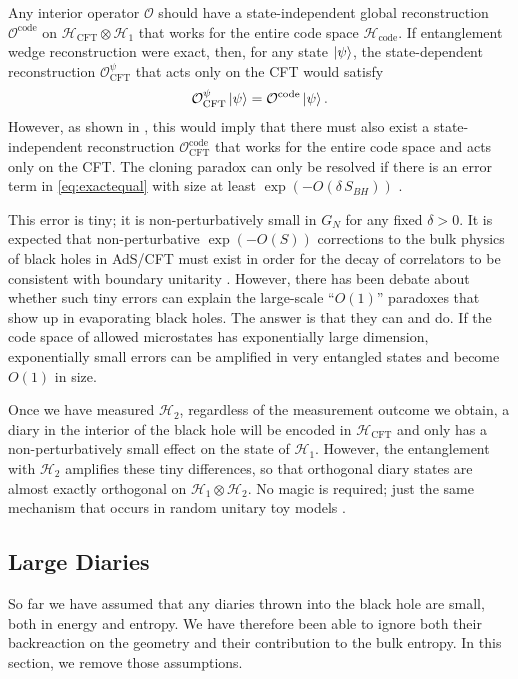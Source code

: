 \documentclass[11pt,a4paper]{article}
\begin{document}
Any interior operator $\mathcal{O}$ should have a state-independent global reconstruction $\mathcal{O}^\text{code}$ on $\mathcal{H}_\text{CFT} \otimes \mathcal{H}_{1}$ that works for the entire code space $\mathcal{H}_\text{code}$. If entanglement wedge reconstruction were exact, then, for any state $\ket{\psi}$, the state-dependent reconstruction $\mathcal{O}_\text{CFT}^{\psi}$ that acts only on the CFT would satisfy
\begin{align} \label{eq:exactequal}
\mathcal{O}_\text{CFT}^{\psi} \ket{\psi} = \mathcal{O}^\text{code} \ket{\psi}.
\end{align}
However, as shown in \cite{hayden2012weak, alphabits}, this would imply that there must also exist a state-independent reconstruction $\mathcal{O}_\text{CFT}^\text{code}$ that works for the entire code space and acts only on the CFT. The cloning paradox can only be resolved if there is an error term in \eqref{eq:exactequal} with size at least $\exp(-O(\delta \,S_{BH}))$ \cite{alphabits}.

This error is tiny; it is non-perturbatively small in $G_N$ for any fixed $\delta > 0$. It is expected that non-perturbative $\exp(-O(S))$ corrections to the bulk physics of black holes in AdS/CFT must exist in order for the decay of correlators to be consistent with boundary unitarity \cite{maldacena2003eternal}. However, there has been debate about whether such tiny errors can explain the large-scale ``$O(1)$'' paradoxes that show up in evaporating black holes. The answer is that they can and do. If the code space of allowed microstates has exponentially large dimension, exponentially small errors can be amplified in very entangled states and become $O(1)$ in size. 

Once we have measured $\mathcal{H}_2$, regardless of the measurement outcome we obtain, a diary in the interior of the black hole will be encoded in $\mathcal{H}_\text{CFT}$ and only has a non-perturbatively small effect on the state of $\mathcal{H}_1$. However, the entanglement with $\mathcal{H}_2$ amplifies these tiny differences, so that orthogonal diary states are almost exactly orthogonal on $\mathcal{H}_1 \otimes \mathcal{H}_2$. No magic is required; just the same mechanism that occurs in random unitary toy models \cite{alphabits}.

\subsection{Large Diaries} \label{sec:largediaries}
So far we have assumed that any diaries thrown into the black hole are small, both in energy and entropy. We have therefore been able to ignore both their backreaction on the geometry and their contribution to the bulk entropy. In this section, we remove those assumptions. 
\end{document}
